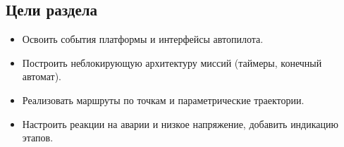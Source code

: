 \subsection*{Цели раздела}
\begin{itemize}
  \item Освоить события платформы и интерфейсы автопилота.
  \item Построить неблокирующую архитектуру миссий (таймеры, конечный автомат).
  \item Реализовать маршруты по точкам и параметрические траектории.
  \item Настроить реакции на аварии и низкое напряжение, добавить индикацию этапов.
\end{itemize}
